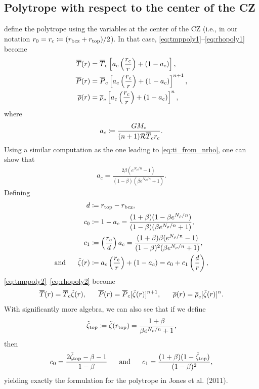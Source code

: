 \documentclass[12pt]{article}
\begin{document}
\subsection{Polytrope with respect to the center of the CZ}
\citet{Jones2011} define the polytrope using the variables at the center of the CZ (i.e., in our notation $r_0=r_c\coloneqq(r_{\rm{bcz}}+r_{\rm{top}})/2$). In that case, \eqref{eq:tmppoly1}--\eqref{eq:rhopoly1} become
\begin{align}
	\overline{T}(r) &= \overline{T}_c\left[a_c\left(\frac{r_c}{r}\right) + (1 - a_c)\right],\label{eq:tmppoly2}\\
	\overline{P}(r) &= \overline{P}_c\left[a_c\left(\frac{r_c}{r}\right) + (1 - a_c)\right]^{n+1},\label{eq:ppoly2}\\
	\overline{\rho}(r) &= \overline{\rho}_c\left[a_c\left(\frac{r_c}{r}\right) + (1 - a_c)\right]^n,\label{eq:rhopoly2}
\end{align} 
where 
\begin{align}
a_c \coloneqq \frac{GM_*}{(n+1)\mathcal{R} \overline{T}_c r_c}.
\label{def:ac}
\end{align}
Using a similar computation as the one leading to \eqref{eq:ti_from_nrho}, one can show that 
\begin{align}
a_c = \frac{2\beta(e^{N_\rho/n}-1)}{(1-\beta)(\beta e^{N_\rho/n} + 1)}.
\label{eq:ac_fromn}
\end{align}
Defining 
\begin{align}
d&\coloneqq r_{\rm{top}}-r_{\rm{bcz}},\label{def:d}\\
c_0&\coloneqq 1-a_c = \frac{(1+\beta)(1-\beta e^{N_\rho/n})}{(1-\beta)(\beta e^{N_\rho/n} + 1)}, \label{def:c0}\\
c_1&\coloneqq \left(\frac{r_c}{d}\right)a_c = \frac{(1+\beta)\beta(e^{N_\rho/n}-1)}{(1-\beta)^2(\beta e^{N_\rho/n} + 1)},\label{def:c1}\\
\text{and}\ \ \ \ \  \tilde{\zeta}(r) &\coloneqq a_c\left(\frac{r_c}{r}\right) + (1-a_c) = c_0 + c_1\left(\frac{d}{r}\right),\label{def:tildezeta}
\end{align}
\eqref{eq:tmppoly2}--\eqref{eq:rhopoly2} become
\begin{align}
\tmpref\ofr=\tmpref_c\tilde{\zeta}(r),\ \ \ \ \ \prsref\ofr=\prsref_c[\tilde{\zeta}(r)]^{n+1},\ \ \ \ \ \rhoref\ofr=\rhoref_c[\tilde{\zeta}(r)]^n. 
\label{eq:polytrope3}
\end{align}
With significantly more algebra, we can also see that if we define
\begin{align}
\tilde{\zeta}_{\rm{top}} \coloneqq \tilde{\zeta}(r_{\rm{top}}) = \frac{1+\beta}{\beta e^{N_\rho/n} + 1}, 
\end{align}
then 
\begin{align}
c_0 = \frac{2\tilde{\zeta}_{\rm{top}} - \beta - 1}{1-\beta} \ \ \ \ \ \text{and}\ \ \ \ \  c_1 = \frac{(1+\beta)(1-\tilde{\zeta}_{\rm{top}})}{(1-\beta)^2},
\label{eq:c01_from_zeta0}
\end{align}
yielding exactly the formulation for the polytrope in Jones et al. (2011). 
\end{document}
